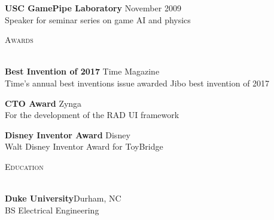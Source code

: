 \documentclass[a4paper]{article}
\newcommand{\lineunder} {
    \vspace*{-8pt} \\
    \hspace*{-18pt} \hrulefill \\
}
\newcommand{\header} [1] {
    {\hspace*{-18pt}\vspace*{6pt} \textsc{#1}}
    \vspace*{-6pt} \lineunder
    \vspace{2mm}
}
\begin{document}
\textbf{USC GamePipe Laboratory} \hfill November 2009\\
Speaker for seminar series on game AI and physics 
\vspace*{4mm}

\header{\faTrophy \hspace{1pt} Awards}

\textbf{Best Invention of 2017} \hfill Time Magazine\\
Time's annual best inventions issue awarded Jibo best invention of 2017
\vspace*{2mm}

\textbf{CTO Award} \hfill Zynga\\
For the development of the RAD UI framework 
\vspace*{2mm}

\textbf{Disney Inventor Award} \hfill Disney\\
Walt Disney Inventor Award for ToyBridge
\vspace*{4mm}

\header{\faGraduationCap \hspace{1pt} Education}
\textbf{Duke University}\hfill Durham, NC\\
BS Electrical Engineering\\
\vspace{4mm}
\end{document}

